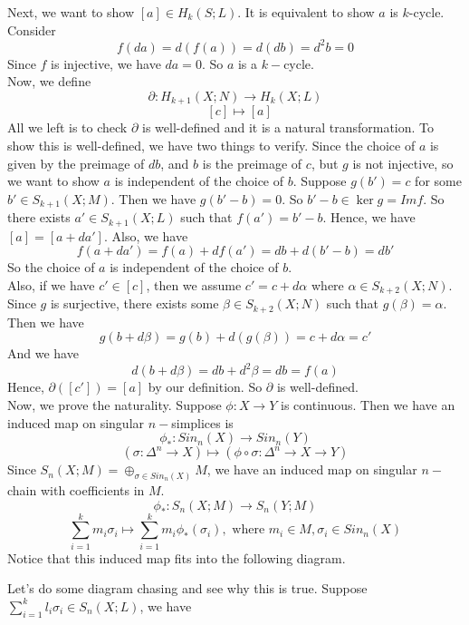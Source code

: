 \documentclass[12pt]{amsart}
\begin{document}
Next, we want to show $[a]\in H_k(S;L)$. It is equivalent to show $a$ is $k$-cycle. Consider
\[f(da)=d(f(a))=d(db)=d^2b=0\]
Since $f$ is injective, we have $da=0$. So $a$ is a $k-$cycle.\\
Now, we define
\[\partial:H_{k+1}(X;N)\to H_k(X;L)\]
\[\ \ \ [c]\mapsto [a]\]
All we left is to check $\partial$ is well-defined and it is a natural transformation. To show this is well-defined, we have two things to verify. Since the choice of $a$ is given by the preimage of $db$, and $b$ is the preimage of $c$, but $g$ is not injective, so we want to show $a$ is independent of the choice of $b$. Suppose $g(b')=c$ for some $b'\in S_{k+1}(X;M)$. Then we have $g(b'-b)=0$. So $b'-b\in \ker g=Im f$. So there exists $a'\in S_{k+1}(X;L)$ such that $f(a')=b'-b$. Hence, we have $[a]=[a+da']$. Also, we have
\[f(a+da')=f(a)+df(a')=db+d(b'-b)=db'\]
So the choice of $a$ is independent of the choice of $b$.\\
Also, if we have $c'\in[c]$, then we assume $c'=c+d\alpha$ where $\alpha\in S_{k+2}(X;N)$. Since $g$ is surjective, there exists some $\beta\in S_{k+2}(X;N)$ such that $g(\beta)=\alpha$. Then we have
\[g(b+d\beta)=g(b)+d(g(\beta))=c+d\alpha=c'\]
And we have
\[d(b+d\beta)=db+d^2\beta=db=f(a)\]
Hence, $\partial([c'])=[a]$ by our definition. So $\partial$ is well-defined.\\
Now, we prove the naturality. Suppose $\phi:X\to Y$ is continuous. Then we have an induced map on singular $n-$simplices is
\[\phi_\ast:Sin_n(X)\to Sin_n(Y)\]
\[(\sigma:\Delta^n\to X)\mapsto (\phi\circ \sigma:\Delta^n\to X\to Y)\]
Since $S_n(X;M)=\oplus_{\sigma\in Sin_n(X)}M$, we have an induced map on singular $n-$chain with coefficients in $M$.
\[\phi_\ast:S_n(X;M)\to S_n(Y;M)\]
\[\sum_{i=1}^km_i\sigma_i\mapsto \sum_{i=1}^km_i\phi_\ast(\sigma_i), \text{ where }m_i\in M, \sigma_i\in Sin_n(X)\]
Notice that this induced map fits into the following diagram.
\begin{center}
\end{center}
Let's do some diagram chasing and see why this is true. Suppose $\sum_{i=1}^kl_i\sigma_i\in S_n(X;L)$, we have 
\end{document}
